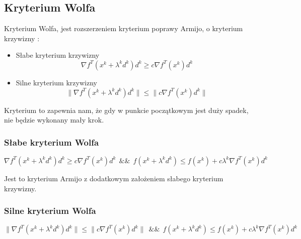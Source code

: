 \documentclass{classrep}
\begin{document}
\subsection{Kryterium Wolfa}

Kryterium Wolfa, jest rozszerzeniem kryterium poprawy Armijo, o kryterium krzywizny :
\begin{itemize}
\item Słabe kryterium krzywizny\\
	\begin{equation}
	\nabla f^{T} (x^{k} + \lambda ^{k} d^{k} ) d^{k} \geq c \nabla f^{T} (x ^{k} ) d^{k}
	\end{equation}
	
\item Silne kryterium krzywizny\\
	\begin{equation}
	\| \nabla f^{T} (x^{k} + \lambda ^{k} d^{k} ) d^{k} \| \leq \| c \nabla f^{T} (x ^{k} ) d^{k} \|
	\end{equation}

\end{itemize}

Kryterium to zapewnia nam, że gdy w punkcie początkowym jest duży spadek, nie będzie wykonany mały krok.


\subsubsection{Słabe kryterium Wolfa}

\begin{equation}
	\nabla f^{T} (x^{k} + \lambda ^{k} d^{k} ) d^{k} \geq c \nabla f^{T} (x ^{k} ) d^{k}  \ \ \&\& \ \ 
	f( x^{k} + \lambda ^{k} d^{k} ) \leq f(x^{k}) + c \lambda ^{k} \nabla f^{T} (x ^{k} ) d^{k}
\end{equation}

Jest to kryterium Armijo z dodatkowym założeniem słabego kryterium krzywizny.

\subsubsection{Silne kryterium Wolfa}

\begin{equation}
	\| \nabla f^{T} (x^{k} + \lambda ^{k} d^{k} ) d^{k} \| \leq \| c \nabla f^{T} (x ^{k} ) d^{k} \| \ \ \&\& \ \ 
	f( x^{k} + \lambda ^{k} d^{k} ) \leq f(x^{k}) + c \lambda ^{k} \nabla f^{T} (x ^{k} ) d^{k}
\end{equation}
\end{document}
